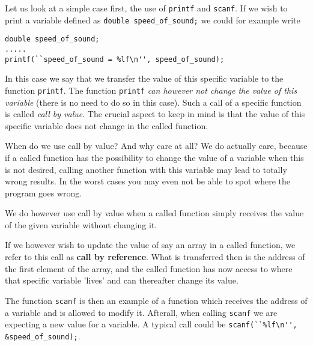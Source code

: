 Let us look at a simple case first, the use of 
\verb?printf? and \verb?scanf?. If we wish to print
a  variable defined as  
\verb?double speed_of_sound;?
we could  for example write 
\begin{lstlisting}
double speed_of_sound;
.....
printf(``speed_of_sound = %lf\n'', speed_of_sound);
\end{lstlisting}

In this case we say that we transfer the value of this specific variable
to the function \verb?printf?. The function \verb?printf? 
{\em can however not change the value of this variable} 
(there is no need to do so in this case). 
Such a call
of a specific  function is called {\em call by value}. 
The crucial aspect to keep in mind is that the value of this
specific variable does not change in the called function.

When do we use call by value? And why care at all? 
We do actually care, because if a called function has the possibility
to change the value of a variable when this is not desired,
calling another function with this variable may lead to totally wrong
results. In the worst cases you may even not be able to spot where the
program goes wrong. 

We do however use call by value when a called function
simply receives the value of the given variable without changing it.

If we however wish to update the value of say an array 
in a called function, we refer to this call as {\bf call by reference}.
What is transferred then is the address of the first element of the array,
and the called function has now access to where that specific
variable 'lives' and can thereafter change its value. 

The function \verb?scanf? is then an example of a function which receives
the address of a variable and is allowed to modify it. Afterall, when calling
\verb?scanf? we are expecting a new value for a variable. 
A typical call could be
\verb?scanf(``%lf\n'', &speed_of_sound);?.

